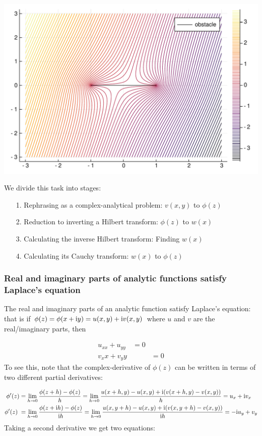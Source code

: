 \documentclass[12pt,a4paper]{article}
\def\I{ {\rm i} }
\def\addtab#1={#1\;&=}
\def\ccr{\\\addtab}
\def\addtab#1={#1\;&=}
\def\ccr{\\\addtab}
\begin{document}
\includegraphics[width=\linewidth]{figures/Lecture15_1_1.pdf}

We divide this task into stages:

\begin{itemize}
\item[1. ] Rephrasing as a complex-analytical problem: $v(x,y)$ to $\phi(z)$


\item[2. ] Reduction to inverting a Hilbert transform: $\phi(z)$ to $w(x)$


\item[3. ] Calculating the inverse Hilbert transform: Finding $w(x)$


\item[4. ] Calculating its Cauchy transform: $w(x)$ to $\phi(z)$

\end{itemize}
\subsubsection{Real and imaginary parts of analytic functions satisfy Laplace's equation}
The real and imaginary parts of an analytic function satisfy Laplace's equation: that is  if  $\phi(z) = \phi(x + \I y) = u(x,y) + \I v(x,y)$ where $u$ and $v$ are the real/imaginary parts, then 


\begin{align*}
 u_{xx} + u_{yy}&= 0 \ccr
 v_{xx} + v_{yy} &= 0
\end{align*}
To see this, note that the complex-derivative of $\phi(z)$ can be written in terms of two different partial derivatives:


\begin{align*}
    \phi'(z) &= \lim_{h \rightarrow 0} {\phi(z+h) - \phi(z) \over h} = \lim_{h \rightarrow 0} {u(x+h,y)-u(x,y) + \I (v(x+h,y)-v(x,y)) \over h} = u_x + \I v_x \ccr
    \phi'(z) = \lim_{h \rightarrow 0} {\phi(z+\I h) - \phi(z) \over \I h} = \lim_{h \rightarrow 0} {u(x,y+h)-u(x,y) + \I (v(x,y+h)-v(x,y)) \over \I h} = - \I u_y + v_y
\end{align*}
Taking a second derivative we get two equations:
\end{document}
